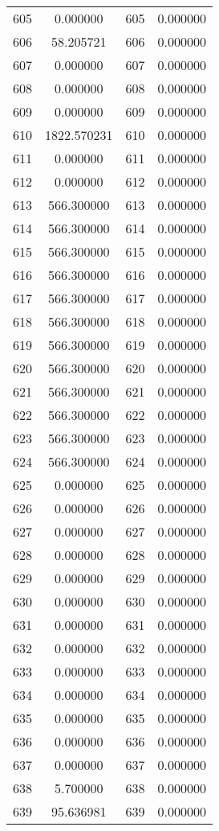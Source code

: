 \documentclass[12pt]{article}
\begin{document}
\begin{longtable}{@{}cccc@{}}
605 & 0.000000 & 605 & 0.000000 \\
606 & 58.205721 & 606 & 0.000000 \\
607 & 0.000000 & 607 & 0.000000 \\
608 & 0.000000 & 608 & 0.000000 \\
609 & 0.000000 & 609 & 0.000000 \\
610 & 1822.570231 & 610 & 0.000000 \\
611 & 0.000000 & 611 & 0.000000 \\
612 & 0.000000 & 612 & 0.000000 \\
613 & 566.300000 & 613 & 0.000000 \\
614 & 566.300000 & 614 & 0.000000 \\
615 & 566.300000 & 615 & 0.000000 \\
616 & 566.300000 & 616 & 0.000000 \\
617 & 566.300000 & 617 & 0.000000 \\
618 & 566.300000 & 618 & 0.000000 \\
619 & 566.300000 & 619 & 0.000000 \\
620 & 566.300000 & 620 & 0.000000 \\
621 & 566.300000 & 621 & 0.000000 \\
622 & 566.300000 & 622 & 0.000000 \\
623 & 566.300000 & 623 & 0.000000 \\
624 & 566.300000 & 624 & 0.000000 \\
625 & 0.000000 & 625 & 0.000000 \\
626 & 0.000000 & 626 & 0.000000 \\
627 & 0.000000 & 627 & 0.000000 \\
628 & 0.000000 & 628 & 0.000000 \\
629 & 0.000000 & 629 & 0.000000 \\
630 & 0.000000 & 630 & 0.000000 \\
631 & 0.000000 & 631 & 0.000000 \\
632 & 0.000000 & 632 & 0.000000 \\
633 & 0.000000 & 633 & 0.000000 \\
634 & 0.000000 & 634 & 0.000000 \\
635 & 0.000000 & 635 & 0.000000 \\
636 & 0.000000 & 636 & 0.000000 \\
637 & 0.000000 & 637 & 0.000000 \\
638 & 5.700000 & 638 & 0.000000 \\
639 & 95.636981 & 639 & 0.000000 \\

\end{longtable}
\end{document}
